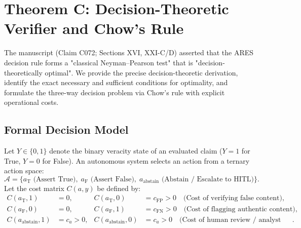 \section{Theorem C: Decision-Theoretic Verifier and Chow's Rule}
\label{sec:thmC}

The manuscript (Claim C072; Sections XVI, XXI-C/D) asserted that the ARES decision rule forms a "classical Neyman--Pearson test" that is "decision-theoretically optimal". We provide the precise decision-theoretic derivation, identify the exact necessary and sufficient conditions for optimality, and formulate the three-way decision problem via Chow's rule with explicit operational costs.

\subsection{Formal Decision Model}
Let $Y \in \{0, 1\}$ denote the binary veracity state of an evaluated claim ($Y=1$ for True, $Y=0$ for False). An autonomous system selects an action from a ternary action space:
\begin{equation}
\mathcal{A} = \{ a_{\text{T}} \text{ (Assert True)}, \; a_{\text{F}} \text{ (Assert False)}, \; a_{\text{abstain}} \text{ (Abstain / Escalate to HITL)} \}.
\end{equation}
Let the cost matrix $C(a, y)$ be defined by:
\begin{align}
C(a_{\text{T}}, 1) &= 0, & C(a_{\text{T}}, 0) &= c_{\text{FP}} > 0 \quad \text{(Cost of verifying false content)}, \nonumber \\
C(a_{\text{F}}, 0) &= 0, & C(a_{\text{F}}, 1) &= c_{\text{FN}} > 0 \quad \text{(Cost of flagging authentic content)}, \nonumber \\
C(a_{\text{abstain}}, 1) &= c_a > 0, & C(a_{\text{abstain}}, 0) &= c_a > 0 \quad \text{(Cost of human review / analyst queue delay)}.
\end{align}

